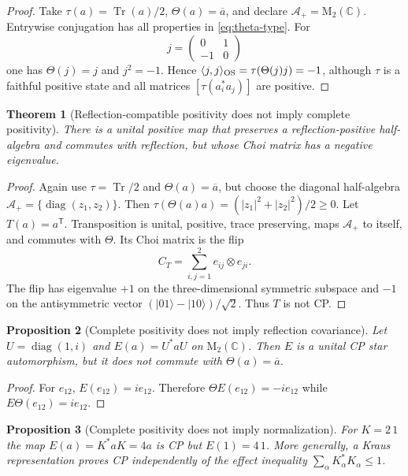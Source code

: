 \documentclass[11pt,a4paper]{article}
\newtheorem{theorem}{Theorem}[section]
\newtheorem{proposition}[theorem]{Proposition}
\theoremstyle{definition}
\theoremstyle{remark}
\newcommand{\C}{\mathbb C}
\newcommand{\A}{\mathcal A}
\newcommand{\M}{\mathrm M}
\newcommand{\Tr}{\operatorname{Tr}}
\newcommand{\ket}[1]{\lvert #1\rangle}
\begin{document}
\begin{proof}
Take $\tau(a)=\Tr(a)/2$, $\Theta(a)=\overline a$, and declare
$\A_+=\M_2(\C)$.  Entrywise conjugation has all properties in
\eqref{eq:theta-type}.  For
\[
 j=\begin{pmatrix}0&1\\-1&0\end{pmatrix}
\]
one has $\Theta(j)=j$ and $j^2=-1$.  Hence
$\langle j,j\rangle_{\rm OS}=\tau(\Theta(j)j)=-1$, although $\tau$ is a faithful
positive state and all matrices $[\tau(a_i^*a_j)]$ are positive.
\end{proof}

\begin{theorem}[Reflection-compatible positivity does not imply complete positivity]
There is a unital positive map that preserves a reflection-positive half-algebra and
commutes with reflection, but whose Choi matrix has a negative eigenvalue.
\end{theorem}

\begin{proof}
Again use $\tau=\Tr/2$ and $\Theta(a)=\overline a$, but choose the diagonal
half-algebra $\A_+=\{\operatorname{diag}(z_1,z_2)\}$.  Then
$\tau(\Theta(a)a)=(|z_1|^2+|z_2|^2)/2\geq0$.  Let $T(a)=a^{\mathsf T}$.  Transposition
is unital, positive, trace preserving, maps $\A_+$ to itself, and commutes with
$\Theta$.  Its Choi matrix is the flip
\begin{equation}
 C_T=\sum_{i,j=1}^{2}e_{ij}\otimes e_{ji}.
\end{equation}
The flip has eigenvalue $+1$ on the three-dimensional symmetric subspace and $-1$ on
the antisymmetric vector $(\ket{01}-\ket{10})/\sqrt2$.  Thus $T$ is not CP.
\end{proof}

\begin{proposition}[Complete positivity does not imply reflection covariance]
Let $U=\operatorname{diag}(1,i)$ and $E(a)=U^*aU$ on $\M_2(\C)$.  Then $E$ is a
unital CP star automorphism, but it does not commute with
$\Theta(a)=\overline a$.
\end{proposition}

\begin{proof}
For $e_{12}$, $E(e_{12})=i e_{12}$.  Therefore
$\Theta E(e_{12})=-i e_{12}$ while $E\Theta(e_{12})=i e_{12}$.
\end{proof}

\begin{proposition}[Complete positivity does not imply normalization]
For $K=2\,1$ the map $E(a)=K^*aK=4a$ is CP but $E(1)=4\,1$.  More generally, a
Kraus representation proves CP independently of the effect inequality
$\sum_\alpha K_\alpha^*K_\alpha\leq1$.
\end{proposition}
\end{document}

